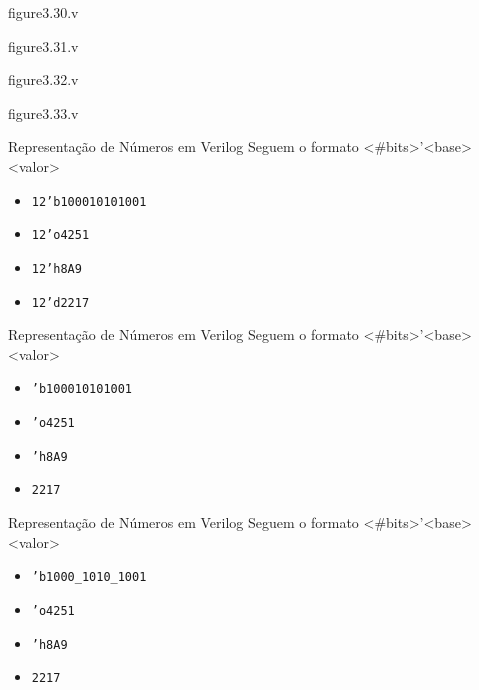 \begin{frame}[fragile]{figure3.30.v}
\end{frame} 

\begin{frame}[fragile]{figure3.31.v}
\end{frame} 

\begin{frame}[fragile]{figure3.32.v}
\end{frame} 

\begin{frame}[fragile]{figure3.33.v}
\end{frame} 

\begin{frame}{Representação de Números em Verilog}
    Seguem o formato <\#bits>'<base><valor>
    \begin{itemize}
        \item {\tt 12'b100010101001}
        \item {\tt 12'o4251}
        \item {\tt 12'h8A9}
        \item {\tt 12'd2217}
    \end{itemize}
\end{frame}


\begin{frame}{Representação de Números em Verilog}
    Seguem o formato <\#bits>'<base><valor>
    \begin{itemize}
        \item {\tt 'b100010101001}
        \item {\tt 'o4251}
        \item {\tt 'h8A9}
        \item {\tt 2217}
    \end{itemize}
\end{frame}


\begin{frame}{Representação de Números em Verilog}
    Seguem o formato <\#bits>'<base><valor>
    \begin{itemize}
        \item {\tt 'b1000\_1010\_1001}
        \item {\tt 'o4251}
        \item {\tt 'h8A9}
        \item {\tt 2217}
    \end{itemize}
\end{frame}

